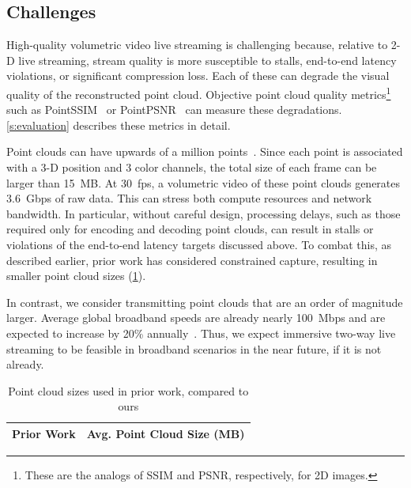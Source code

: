 \subsection{Challenges}
\label{s:challenges}

High-quality volumetric video live streaming is challenging
because, relative to 2-D live streaming, stream quality is more susceptible to
stalls, end-to-end latency violations, or significant compression loss.
%
Each of these can degrade the visual quality of the reconstructed point cloud.
%
Objective point cloud quality metrics\footnote{These are the analogs of SSIM and PSNR, respectively, for 2D images.} such as PointSSIM~\cite{pointssim} or PointPSNR~\cite{p2psnr} can measure these degradations.
%
\cref{s:evaluation} describes these metrics in detail.


%
Point clouds can have upwards of a million points~\cite{cite:8i-dataset, cite:vsense}.
%
Since each point is associated with a 3-D position and 3 color channels, the
total size of each frame can be larger than 15~MB.
%
At 30~fps, a volumetric video of these point clouds generates 3.6~Gbps of raw data.
%
This can stress both compute resources and network bandwidth.
%
In particular, without careful design, processing delays, such as those
required only for encoding and decoding point clouds, can result in stalls or violations of 
the end-to-end latency targets discussed above.
%
To combat this, as described earlier, prior work has considered constrained capture, resulting in smaller point cloud sizes (\cref{tab:sizes}).


In contrast, we consider transmitting point clouds that are an order of magnitude larger.
%
Average global broadband speeds are already nearly 100~Mbps and are expected to increase by 20\% annually~\cite{cisco}. Thus, we expect immersive two-way live streaming to be feasible in broadband scenarios in the near future, if it is not already.

\begin{table}[t]
  \begin{tabular}{|l|l|} \hline
    \textbf{Prior Work} & \textbf{Avg. Point Cloud Size (MB)} \\ \hline
  \end{tabular}
  \caption{Point cloud sizes used in prior work, compared to ours}
  \label{tab:sizes}
\end{table}

